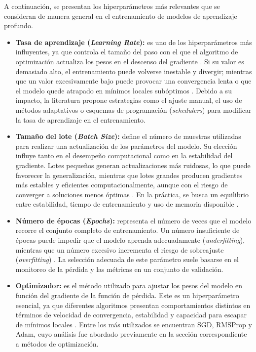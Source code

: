 	A continuación, se presentan los hiperparámetros más relevantes que se consideran de manera general en el entrenamiento de modelos de aprendizaje profundo.
	
	\begin{itemize}
		
		\item \textbf{Tasa de aprendizaje (\textit{Learning Rate}):} es uno de los hiperparámetros más influyentes, ya que controla el tamaño del paso con el que el algoritmo de optimización actualiza los pesos en el descenso del gradiente \cite{goodfellow2016dl}. Si su valor es demasiado alto, el entrenamiento puede volverse inestable y divergir; mientras que un valor excesivamente bajo puede provocar una convergencia lenta o que el modelo quede atrapado en mínimos locales subóptimos \cite{smith2018}. Debido a su impacto, la literatura propone estrategias como el ajuste manual, el uso de métodos adaptativos o esquemas de programación (\textit{schedulers}) para modificar la tasa de aprendizaje en el entrenamiento.
		
		\item \textbf{Tamaño del lote (\textit{Batch Size}):} define el número de muestras utilizadas para realizar una actualización de los parámetros del modelo. Su elección influye tanto en el desempeño computacional como en la estabilidad del gradiente. Lotes pequeños generan actualizaciones más ruidosas, lo que puede favorecer la generalización, mientras que lotes grandes producen gradientes más estables y eficientes computacionalmente, aunque con el riesgo de converger a soluciones menos óptimas \cite{keskar2017, goyal2017}. En la práctica, se busca un equilibrio entre estabilidad, tiempo de entrenamiento y uso de memoria disponible \cite{goodfellow2016dl}.
		
		\item \textbf{Número de épocas (\textit{Epochs}):} representa el número de veces que el modelo recorre el conjunto completo de entrenamiento. Un número insuficiente de épocas puede impedir que el modelo aprenda adecuadamente (\textit{underfitting}), mientras que un número excesivo incrementa el riesgo de sobreajuste (\textit{overfitting}) \cite{bishop2006, ng2020}. La selección adecuada de este parámetro suele basarse en el monitoreo de la pérdida y las métricas en un conjunto de validación.
		
		\item \textbf{Optimizador:} es el método utilizado para ajustar los pesos del modelo en función del gradiente de la función de pérdida. Este es un hiperparámetro esencial, ya que diferentes algoritmos presentan comportamientos distintos en términos de velocidad de convergencia, estabilidad y capacidad para escapar de mínimos locales \cite{shalev2014}. Entre los más utilizados se encuentran SGD, RMSProp y Adam, cuyo análisis fue abordado previamente en la sección correspondiente a métodos de optimización.
		

\end{itemize}
